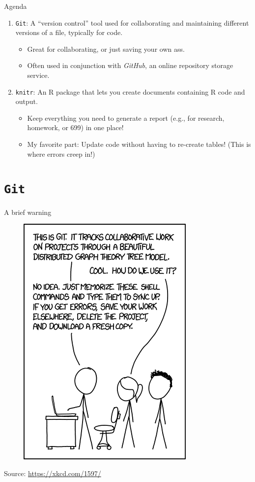 \documentclass{beamer}\usepackage[]{graphicx}\usepackage[]{color}
\begin{document}
	\begin{frame}{Agenda}
		\begin{enumerate}
			\item \texttt{Git}: A ``version control'' tool used for collaborating and maintaining different versions of a file, typically for code.
			\begin{itemize}
				\item Great for collaborating, or just saving your own ass.
				\item Often used in conjunction with \textit{GitHub}, an online repository storage service.
			\end{itemize}
			\item \texttt{knitr}: An R package that lets you create documents containing R code and output.
			\begin{itemize}
				\item Keep everything you need to generate a report (e.g., for research, homework, or 699) in one place!
				\item My favorite part: Update code without having to re-create tables! (This is where errors creep in!)
			\end{itemize}
		\end{enumerate}
	\end{frame}
	
	\section{\texttt{Git}}  
	
	\begin{frame}{A brief warning}

  \begin{figure}
			\centering
			\includegraphics[height=.75\textheight]{xkcd-git.png}
		\end{figure}
		\scriptsize{Source: \url{https://xkcd.com/1597/}}
	\end{frame}
	
\end{document}
